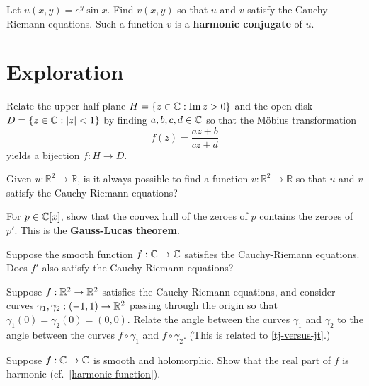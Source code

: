 \documentclass{homework}
\begin{document}
\begin{problem}\label{harmonic-conjugate}Let $u(x,y) = e^y \sin x$.  Find $v(x,y)$ so that $u$ and $v$
  satisfy the Cauchy-Riemann equations.  Such a function $v$ is a
  \textbf{harmonic conjugate} of $u$.
\end{problem}

\section{Exploration}

\begin{problem}\label{cayley-transform}Relate the upper half-plane
  $H = \{ z \in \mathbb{C} : \operatorname{Im} z > 0 \}$ and the open disk
  $D = \{ z \in \mathbb{C} : \left|z\right| < 1 \}$ by finding $a,b,c,d \in \mathbb{C}$ so that the M\"obius transformation
  \[f(z) = \frac{az + b}{cz + d}\] yields a bijection $f : H \to D$.
\end{problem}

\begin{problem}\label{harmonic-necessary}Given $u : \mathbb{R}^2 \to \mathbb{R}$, is it always possible to
  find a function $v : \mathbb{R}^2 \to \mathbb{R}$ so that $u$ and
  $v$ satisfy the Cauchy-Riemann equations?
\end{problem}

\begin{problem}
  For $p \in \mathbb{C}[x]$, show that the convex hull of the zeroes of $p$
  contains the zeroes of $p'$.  This is the \textbf{Gauss-Lucas
    theorem}.
\end{problem}

\begin{problem}
  Suppose the smooth function $f : \mathbb{C} \to \mathbb{C}$ satisfies the
  Cauchy-Riemann equations.  Does $f'$ also satisfy the Cauchy-Riemann
  equations?
\end{problem}

\begin{problem}
  Suppose $f : \mathbb{R}^2 \to \mathbb{R}^2$ satisfies the Cauchy-Riemann equations,
  and consider curves $\gamma_1, \gamma_2 : (-1,1) \to \mathbb{R}^2$ passing
  through the origin so that $\gamma_1(0) = \gamma_2(0) = (0,0)$.
  Relate the angle between the curves $\gamma_1$ and $\gamma_2$ to the
  angle between the curves $f \circ \gamma_1$ and $f \circ \gamma_2$.
  (This is related to \ref{tj-versus-jt}.)
\end{problem}

\begin{problem}
  Suppose $f : \mathbb{C} \to \mathbb{C}$ is smooth and holomorphic.  Show that the
  real part of $f$ is harmonic (cf.~\ref{harmonic-function}).
\end{problem}
\end{document}
